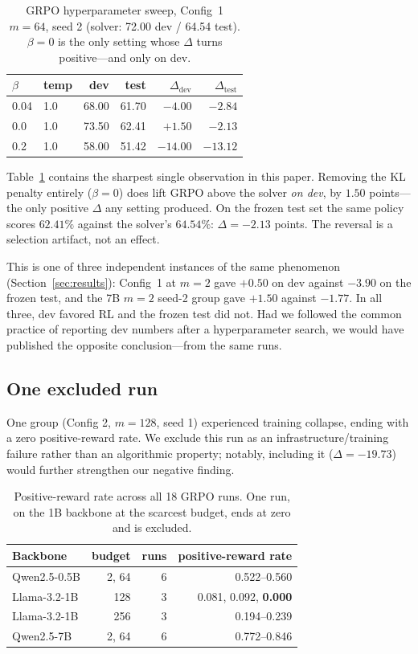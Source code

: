 \begin{table}[t]
\centering
\small
\setlength{\tabcolsep}{3.5pt}
\caption{GRPO hyperparameter sweep, Config~1 $m{=}64$, seed 2 (solver: 72.00
dev / 64.54 test). $\beta{=}0$ is the only setting whose $\Delta$ turns
positive---and only on dev.}
\label{tab:sweep}
\begin{tabular}{llrrrr}
\toprule
$\beta$ & temp & dev & test & $\Delta_{\text{dev}}$ & $\Delta_{\text{test}}$ \\
\midrule
0.04 & 1.0 & 68.00 & 61.70 & $-4.00$ & $-2.84$ \\
0.0  & 1.0 & 73.50 & 62.41 & $\mathbf{+1.50}$ & $\mathbf{-2.13}$ \\
0.2  & 1.0 & 58.00 & 51.42 & $-14.00$ & $-13.12$ \\
\bottomrule
\end{tabular}
\end{table}

Table~\ref{tab:sweep} contains the sharpest single observation in this paper.
Removing the KL penalty entirely ($\beta{=}0$) does lift GRPO above the solver
\emph{on dev}, by $1.50$ points---the only positive $\Delta$ any setting
produced. On the frozen test set the same policy scores $62.41\%$ against the
solver's $64.54\%$: $\Delta = -2.13$ points. The reversal is a selection
artifact, not an effect.

This is one of three independent instances of the same phenomenon
(Section~\ref{sec:results}): Config~1 at $m{=}2$ gave $+0.50$ on dev against
$-3.90$ on the frozen test, and the 7B $m{=}2$ seed-2 group gave $+1.50$
against $-1.77$. In all three, dev favored RL and the frozen test did not. Had we followed the common practice of reporting dev numbers after a
hyperparameter search, we would have published the opposite conclusion---from
the same runs.

\subsection{One excluded run}

One group (Config 2, $m=128$, seed 1) experienced training collapse, ending with a zero positive-reward rate. We exclude this run as an infrastructure/training failure rather than an algorithmic property; notably, including it ($\Delta = -19.73$) would further strengthen our negative finding.

\begin{table}[t]
\centering
\small
\caption{Positive-reward rate across all 18 GRPO runs. One run, on the 1B
backbone at the scarcest budget, ends at zero and is excluded.}
\label{tab:stability}
\begin{tabular}{lrrr}
\toprule
Backbone & budget & runs & positive-reward rate \\
\midrule
Qwen2.5-0.5B & 2, 64   & 6 & 0.522--0.560 \\
Llama-3.2-1B & 128     & 3 & 0.081, 0.092, \textbf{0.000} \\
Llama-3.2-1B & 256     & 3 & 0.194--0.239 \\
Qwen2.5-7B   & 2, 64   & 6 & 0.772--0.846 \\
\bottomrule
\end{tabular}
\end{table}

